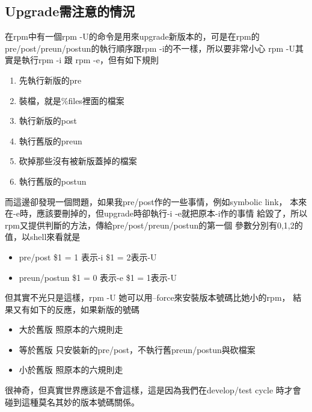   \subsection{Upgrade需注意的情況}
  在rpm中有一個rpm -U的命令是用來upgrade新版本的，可是在rpm的
  pre/post/preun/postun的執行順序跟rpm -i的不一樣，所以要非常小心
  rpm -U其實是執行rpm -i 跟 rpm -e，但有如下規則
  \begin{enumerate}
    \item 先執行新版的pre
    \item 裝檔，就是\%files裡面的檔案
    \item 執行新版的post
    \item 執行舊版的preun
    \item 砍掉那些沒有被新版蓋掉的檔案
    \item 執行舊版的postun
  \end{enumerate}
  而這邊卻發現一個問題，如果我pre/post作的一些事情，例如symbolic link，
  本來在-e時，應該要刪掉的，但upgrade時卻執行-i -e就把原本-i作的事情
  給毀了，所以rpm又提供判斷的方法，傳給pre/post/preun/postun的第一個
  參數分別有0,1,2的值，以shell來看就是
  \begin{itemize}
    \item pre/post     \$1 = 1 表示-i \$1 = 2表示-U
    \item preun/postun \$1 = 0 表示-e \$1 = 1表示-U
  \end{itemize}
  但其實不光只是這樣，rpm -U 她可以用--force來安裝版本號碼比她小的rpm，
  結果又有如下的反應，如果新版的號碼
  \begin{itemize}
    \item 大於舊版 照原本的六規則走
    \item 等於舊版 只安裝新的pre/post，不執行舊preun/postun與砍檔案
    \item 小於舊版 照原本的六規則走
  \end{itemize}
  很神奇，但真實世界應該是不會這樣，這是因為我們在develop/test cycle
  時才會碰到這種莫名其妙的版本號碼關係。

